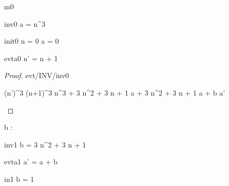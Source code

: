 \documentclass[12pt]{amsart}
\title{}
\author{}
\date{} %
\begin{document}
\maketitle
\tableofcontents


\begin{machine}{m0}


\begin{invariant}{inv0}
	a = n^3
\end{invariant}

%	


\begin{initialization}{init0}
	n = 0 \land a = 0
\end{initialization}

\begin{evassignment}{evt}{a0}
	n' = n + 1
\end{evassignment}

\begin{proof}{evt/INV/inv0}
	\begin{calculation}
		(n')^3
	\hint{=}{ \ref{a0} }
		(n+1)^3
		n^3 + 3 \cdot n^2 + 3 \cdot n + 1
	\hint{=}{ \ref{inv0} }
		a + 3 \cdot n^2 + 3 \cdot n + 1
	\hint{=}{ \ref{inv1} }
		a + b
	\hint{=}{ \ref{a1} }
		a'
	\end{calculation}
\end{proof}

\begin{variable}
	b : \Int
\end{variable}

\begin{invariant}{inv1}
	b = 3 \cdot n^2 + 3 \cdot n + 1
\end{invariant}

\begin{evassignment}{evt}{a1}
	a' = a + b
\end{evassignment}

\begin{initialization}{in1}
	b = 1
\end{initialization}

\end{machine}
\end{document}
